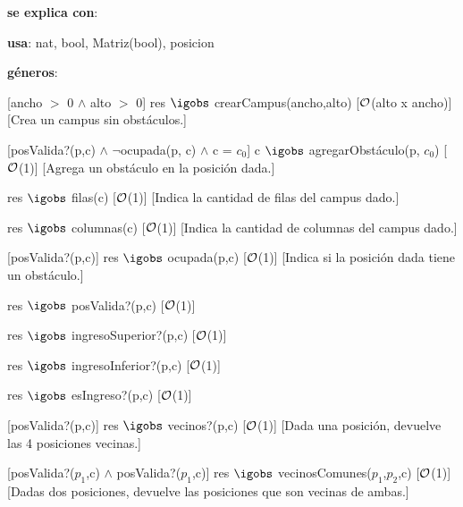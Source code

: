 \begin{Interfaz}
  
	\textbf{se explica con}: 
	
	\textbf{usa}: nat, bool, Matriz(bool), posicion
	
	\textbf{géneros}: 
	

	[ancho $>$ 0 $\land$ alto $>$ 0]
	{res $\igobs$ crearCampus(ancho,alto)}
	[$\mathcal{O}$(alto x ancho)]
	[Crea un campus sin obstáculos.]
	
	[posValida?(p,c) $\land$ $\neg$ocupada(p, c) $\land$ c = $c_{0}$]
	{c $\igobs$ agregarObstáculo(p, $c_{0}$)}
	[$\mathcal{O}$(1)]
	[Agrega un obstáculo en la posición dada.]
	
	{res $\igobs$ filas(c)}
	[$\mathcal{O}$(1)]
	[Indica la cantidad de filas del campus dado.]
	
	{res $\igobs$ columnas(c)}
	[$\mathcal{O}$(1)]
	[Indica la cantidad de columnas del campus dado.]	
	
	[posValida?(p,c)]
	{res $\igobs$ ocupada(p,c)}
	[$\mathcal{O}$(1)]
	[Indica si la posición dada tiene un obstáculo.]
	
	{res $\igobs$ posValida?(p,c)}
	[$\mathcal{O}$(1)]
	
	{res $\igobs$ ingresoSuperior?(p,c)}
	[$\mathcal{O}$(1)]
	
	{res $\igobs$ ingresoInferior?(p,c)}
	[$\mathcal{O}$(1)]
	
	{res $\igobs$ esIngreso?(p,c)}
	[$\mathcal{O}$(1)]
	
	[posValida?(p,c)]
	{res $\igobs$ vecinos?(p,c)}
	[$\mathcal{O}$(1)]
	[Dada una posición, devuelve las 4 posiciones vecinas.]
		
	[posValida?($p_1$,c) $\land$ posValida?($p_1$,c)]
	{res $\igobs$ vecinosComunes($p_1$,$p_2$,c)}
	[$\mathcal{O}$(1)]
	[Dadas dos posiciones, devuelve las posiciones que son vecinas de ambas.]
	

\end{Interfaz}

